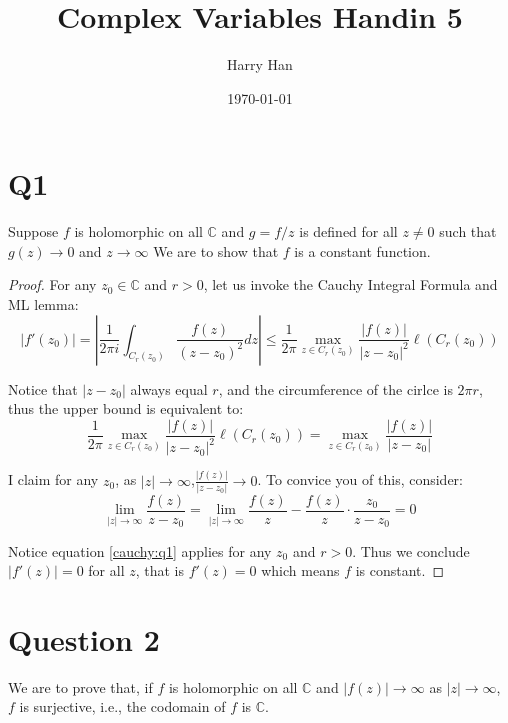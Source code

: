\documentclass[12pt, a4paper]{article}
\title{Complex Variables Handin 5}
\author{Harry Han}
\date{\today}
\theoremstyle{definition}
\theoremstyle{remark}
\newcommand{\bb}[1]{\mathbb{#1}}
\begin{document}
\maketitle

\section{Q1}
Suppose $f$ is holomorphic on all $\bb{C}$ and $g = f/z$ is defined for all $z \neq 0$ such that $g(z) \rightarrow  0$ and $z \rightarrow \infty $ We are to show that $f$ is a constant function.

\begin{proof}
	For any $z_0\in \bb{C}$ and $r>0$, let us invoke the Cauchy Integral Formula and ML lemma:
	\begin{equation}\label{cauchy:q1}
		|f'(z_0)| = \left|\frac{1}{2\pi i} \int _{C_r(z_0)} \frac{f(z)}{(z-z_0)^2} dz \right| 
		\leq \frac{1}{2\pi} \max_{z \in C_r(z_0)} \frac{|f(z)|}{|z-z_0|^2} \ell(C_r(z_0))	
	\end{equation}

	Notice that $|z-z_0|$ always equal $r$, and the circumference of the cirlce is $2 \pi r$, thus the upper bound is equivalent to:
	\begin{equation}
	\frac{1}{2\pi} \max_{z \in C_r(z_0)} \frac{|f(z)|}{|z-z_0|^2} \ell(C_r(z_0))	
	=
	  \max_{z \in C_r(z_0)} \frac{|f(z)|}{|z-z_0|} 
	\end{equation}

	I claim for any $z_0$, as $|z| \rightarrow  \infty$,$  \frac{|f(z)|}{|z-z_0|} \rightarrow  0$. To convice you of this, consider:
	\begin{equation}
		\lim_{|z| \rightarrow \infty} \frac{f(z)}{z-z_0} = \lim_{|z| \rightarrow \infty} \frac{f(z)}{z} -\frac{f(z)}{z} \cdot \frac{z_0}{z-z_0} = 0
	\end{equation}

	Notice equation \ref{cauchy:q1} applies for any $z_0$ and $r>0$. 
	Thus we conclude $|f'(z)| = 0$ for all $z$, that is $f'(z) =0$ which means $f$ is constant.
\end{proof}	

\section{Question 2}
We are to prove that, if $f$ is holomorphic on all $\bb{C}$ and $|f(z)| \rightarrow  \infty$ as $|z| \rightarrow  \infty$, $f$ is surjective, i.e., the codomain of $f$ is $\bb{C}$.
\end{document}
